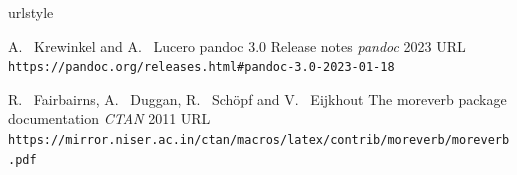 \begin{thebibliography}{99}
    \providecommand{\natexlab}[1]{#1}
    \providecommand{\url}[1]{\texttt{#1}}
    \expandafter\ifx\csname urlstyle\endcsname\relax
      \providecommand{\doi}[1]{doi: #1}\else
      \providecommand{\doi}{doi: \begingroup \urlstyle{rm}\Url}\fi

A.~ Krewinkel and A.~ Lucero
\newblock pandoc 3.0 Release notes
\newblock \emph{pandoc}  2023
\newblock URL \url{https://pandoc.org/releases.html#pandoc-3.0-2023-01-18}

R.~ Fairbairns, A.~ Duggan, R.~ Schöpf and V.~ Eijkhout
\newblock The moreverb package documentation
\newblock \emph{CTAN}  2011
\newblock URL \url{https://mirror.niser.ac.in/ctan/macros/latex/contrib/moreverb/moreverb.pdf}

\end{thebibliography}


\address{%
Abhishek Ulayil\\
Student, Institute of Actuaries of India\\%
Mumbai, India\\
ORCiD: 0009-0000-6935-8690\\
}
